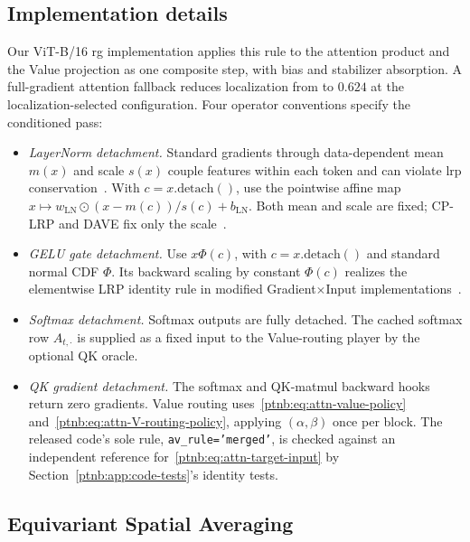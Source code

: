 \subsection{Implementation details}\label{ptnb:app:vit-implementation}\label{sec:vit_implementation}

Our ViT-B/16 \ac{rg} implementation applies this rule to the attention product and the Value projection as one composite step, with bias and stabilizer absorption. A full-gradient attention fallback reduces localization from \vitRGlocAL{} to $0.624$ at the localization-selected configuration. Four operator conventions specify the conditioned pass:
\begin{itemize}
    \item \emph{LayerNorm detachment.}\label{ptnb:app:dave-conditioned} Standard gradients through data-dependent mean $m(x)$ and scale $s(x)$ couple features within each token and can violate \ac{lrp} conservation~\parencite{Ali2022AttnLRP}. With $c=x.\text{detach}()$, use the pointwise affine map $x\mapsto w_{\mathrm{LN}}\odot(x-m(c))/s(c)+b_{\mathrm{LN}}$. Both mean and scale are fixed; CP-LRP and DAVE fix only the scale~\parencite{Wrobel2024}.
    \item \emph{GELU gate detachment.} Use $x\Phi(c)$, with $c=x.\text{detach}()$ and standard normal CDF $\Phi$. Its backward scaling by constant $\Phi(c)$ realizes the elementwise LRP identity rule in modified Gradient$\times$Input implementations~\parencite[Appendix~D.3]{Arras2025CloseLook}.
    \item \emph{Softmax detachment.} Softmax outputs are fully detached. The cached softmax row $A_{t,\cdot}$ is supplied as a fixed input to the Value-routing player by the optional QK oracle.
    \item \emph{QK gradient detachment.}\label{ptnb:app:attention-grad-detach} The softmax and QK-matmul backward hooks return zero gradients. Value routing uses~\eqref{ptnb:eq:attn-value-policy} and~\eqref{ptnb:eq:attn-V-routing-policy}, applying $(\alpha,\beta)$ once per block. The released code's sole rule, \texttt{av\_rule='merged'}, is checked against an independent reference for~\eqref{ptnb:eq:attn-target-input} by Section~\ref{ptnb:app:code-tests}'s identity tests.
\end{itemize}

\subsection{Equivariant Spatial Averaging}\label{ptnb:app:equivariant}

